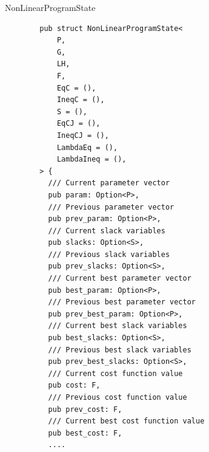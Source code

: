 \documentclass{beamer}
\begin{document}
\begin{frame}[fragile]{NonLinearProgramState}

  \begin{listing}
    \begin{verbatim}
        pub struct NonLinearProgramState<
            P,
            G,
            LH,
            F,
            EqC = (),
            IneqC = (),
            S = (),
            EqCJ = (),
            IneqCJ = (),
            LambdaEq = (),
            LambdaIneq = (),
        > {
          /// Current parameter vector
          pub param: Option<P>,
          /// Previous parameter vector
          pub prev_param: Option<P>,
          /// Current slack variables
          pub slacks: Option<S>,
          /// Previous slack variables
          pub prev_slacks: Option<S>,
          /// Current best parameter vector
          pub best_param: Option<P>,
          /// Previous best parameter vector
          pub prev_best_param: Option<P>,
          /// Current best slack variables
          pub best_slacks: Option<S>,
          /// Previous best slack variables
          pub prev_best_slacks: Option<S>,
          /// Current cost function value
          pub cost: F,
          /// Previous cost function value
          pub prev_cost: F,
          /// Current best cost function value
          pub best_cost: F,
          ....
    \end{verbatim}
  \end{listing}

\end{frame}
\end{document}
